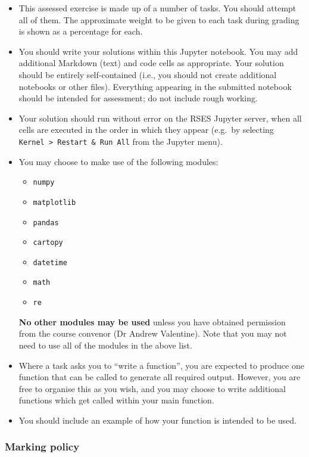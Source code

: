 \documentclass[11pt]{article}
\providecommand{\tightlist}{%
      \setlength{\itemsep}{0pt}\setlength{\parskip}{0pt}}
\begin{document}
\begin{itemize}
\item
  This assessed exercise is made up of a number of tasks. You should
  attempt all of them. The approximate weight to be given to each task
  during grading is shown as a percentage for each.
\item
  You should write your solutions within this Jupyter notebook. You may
  add additional Markdown (text) and code cells as appropriate. Your
  solution should be entirely self-contained (i.e., you should not
  create additional notebooks or other files). Everything appearing in
  the submitted notebook should be intended for assessment; do not
  include rough working.
\item
  Your solution should run without error on the RSES Jupyter server,
  when all cells are executed in the order in which they appear (e.g.~by
  selecting \texttt{Kernel\ \textgreater{}\ Restart\ \&\ Run\ All} from
  the Jupyter menu).
\item
  You may choose to make use of the following modules:

  \begin{itemize}
  \tightlist
  \item
    \texttt{numpy}
  \item
    \texttt{matplotlib}
  \item
    \texttt{pandas}
  \item
    \texttt{cartopy}
  \item
    \texttt{datetime}
  \item
    \texttt{math}
  \item
    \texttt{re}
  \end{itemize}

  \textbf{No other modules may be used} unless you have obtained
  permission from the course convenor (Dr Andrew Valentine). Note that
  you may not need to use all of the modules in the above list.
\item
  Where a task asks you to ``write a function'', you are expected to
  produce one function that can be called to generate all required
  output. However, you are free to organise this as you wish, and you
  may choose to write additional functions which get called within your
  main function.
\item
  You should include an example of how your function is intended to be
  used.
\end{itemize}

\hypertarget{marking-policy}{%
\subsubsection*{Marking policy}\label{marking-policy}}
\end{document}
